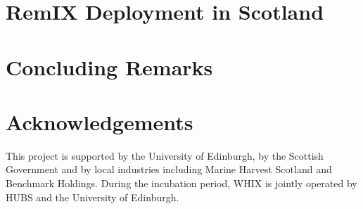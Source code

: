 \documentclass{sig-alternate-10pt}
\begin{document}
\section{RemIX Deployment in Scotland} \label{sec:impl} 


\section{Concluding Remarks} \label{sec:conc} 

\section{Acknowledgements}
This project is supported by the University of Edinburgh, by the
Scottish Government and by local industries including Marine Harvest
Scotland and Benchmark Holdings.  During the incubation period,
\ac{WHIX} is jointly operated by HUBS and the University of Edinburgh.



\end{document}
